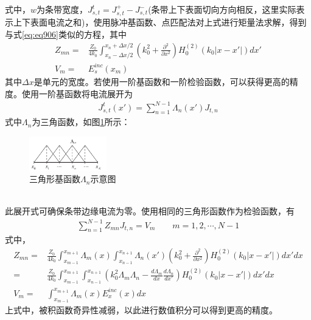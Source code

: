 \documentclass{article}
\numberwithin{equation}{section}
\begin{document}
式中，$w$为条带宽度，$J^t_{s,t}=J^+_{s,t}-J^-_{s,t}$(条带上下表面切向方向相反，这里实际表示上下表面电流之和)，使用脉冲基函数、点匹配法对上式进行矩量法求解，得到与式\ref{eq:eq906}类似的方程，其中
\begin{align}
    \label{eq:eq914}
    Z_{mn}=&\frac{Z_0}{4k_0}\int_{x_n-\Delta x/2}^{x_n+\Delta x/2}\left(k_0^2+\frac{\partial^2}{\partial x^2}\right)H_0^{(2)}(k_0|x-x'|)dx' \\
    \label{eq:eq915}
    V_m=&E^{inc}_s(x_m)
\end{align}
其中$\Delta x$是单元的宽度。若使用一阶基函数和一阶检验函数，可以获得更高的精度。使用一阶基函数将电流展开为
\begin{align}
    \label{eq:eq916}
    J_{s,t}^t(x')=\sum_{n=1}^{N-1}\Lambda_n(x')J_{t,n}
\end{align}
式中$\Lambda_n$为三角函数，如图\ref{fig:fig66}所示：
\begin{figure}[ht]
    \centering
    \includegraphics[width=0.3\textwidth]{三角形基函数示意图.PNG}
    \caption{三角形基函数$\Lambda_n$示意图}
    \label{fig:fig66}
\end{figure}
\\
此展开式可确保条带边缘电流为零。使用相同的三角形函数作为检验函数，有
\begin{align}
    \label{eq:eq917}
    \sum_{n=1}^{N-1}Z_{mn}J_{t,n}=V_m\qquad m=1,2,\cdots,N-1
\end{align}
式中，
\begin{align}
    \label{eq:eq918}
    Z_{mn}=&\frac{Z_0}{4k_0}\int_{x_{m-1}}^{x_{m+1}}\Lambda_m(x)\int_{x_{n-1}}^{x_{n+1}}\Lambda_n(x')\left(k_0^2+\frac{\partial^2}{\partial x^2}\right)H_0^{(2)}(k_0|x-x'|)dx'dx \nonumber \\
          =&\frac{Z_0}{4k_0}\int_{x_{m-1}}^{x_{m+1}}\int_{x_{n-1}}^{x_{n+1}}\left(k_0^2\Lambda_m\Lambda_n-\frac{d\Lambda_m}{dx}\frac{d\Lambda_n}{dx'}\right)H_0^{(2)}(k_0|x-x'|)dx'dx \\
    \label{eq:eq919}
    V_m=&\int_{x_{m-1}}^{x_{m+1}}\Lambda_m(x)E_x^{inc}(x)dx
\end{align}
上式中，被积函数奇异性减弱，以此进行数值积分可以得到更高的精度。
\end{document}
